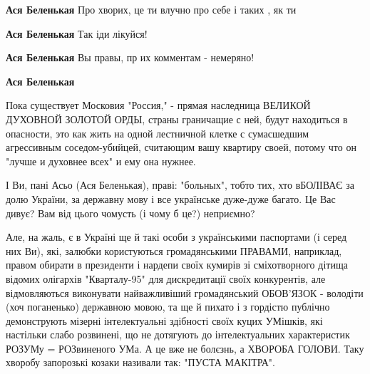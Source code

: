 \begin{itemize}

\textbf{Ася Беленькая}
Про хворих, це ти влучно про себе і таких , як ти\Laughey[1.0][white]


\textbf{Ася Беленькая} Так іди лікуйся!


\textbf{Ася Беленькая} Вы правы, пр их комментам - немеряно!


\textbf{Ася Беленькая} 

Пока существует Московия "Россия," - прямая наследница
ВЕЛИКОЙ ДУХОВНОЙ ЗОЛОТОЙ ОРДЫ, страны граничащие с ней, будут находиться в
опасности, это как жить на одной лестничной клетке с сумасшедшим агрессивным
соседом-убийцей, считающим вашу квартиру своей, потому что он "лучше и духовнее
всех" и ему она нужнее.



І Ви, пані Асьо (Ася Беленькая), праві: "больных", тобто тих, хто вБОЛІВАЄ за
долю України, за державну мову і все українське дуже-дуже багато. Це Вас дивує?
Вам від цього чомусть (і чому б це?) неприємно? 

Але, на жаль, є в Україні ще й
такі особи з українськими паспортами (і серед них Ви), які, залюбки
користуються громадянськими ПРАВАМИ, наприклад, правом обирати в президенти і
нардепи своїх кумирів зі сміхотворного дітища відомих олігархів "Кварталу-95"
для дискредитації своїх конкурентів, але відмовляються виконувати найважливіший
громадянський ОБОВ'ЯЗОК - володіти (хоч поганенько) державною мовою, та ще й
пихато і з гордістю публічно демонструють мізерні інтелектуальні здібності
своїх куцих УМішків, які настільки слабо розвинені, що не дотягують до
інтелектуальних характеристик РОЗУМу = РОЗвиненого УМа. А це вже не болєзнь, а
ХВОРОБА ГОЛОВИ. Таку хворобу запорозькі козаки називали так: "ПУСТА МАКІТРА".


\end{itemize}
